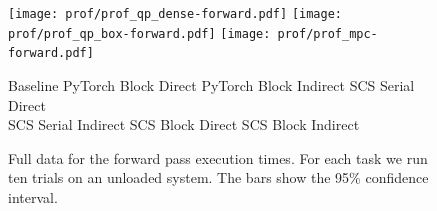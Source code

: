 \begin{figure}[!h]
  \centering
  \texttt{[image: prof/prof\_qp\_dense-forward.pdf]}
  \texttt{[image: prof/prof\_qp\_box-forward.pdf]}
  \texttt{[image: prof/prof\_mpc-forward.pdf]}

   Baseline \enskip
   PyTorch Block Direct \enskip
   PyTorch Block Indirect \enskip
   SCS Serial Direct \\
   SCS Serial Indirect \enskip
   SCS Block Direct \enskip
   SCS Block Indirect

  \caption{Full data for the forward pass execution times.
    For each task we run ten trials on an unloaded system.
    The bars show the 95\% confidence interval.
  }
  \label{fig:eval:fwd:all}
\end{figure}

